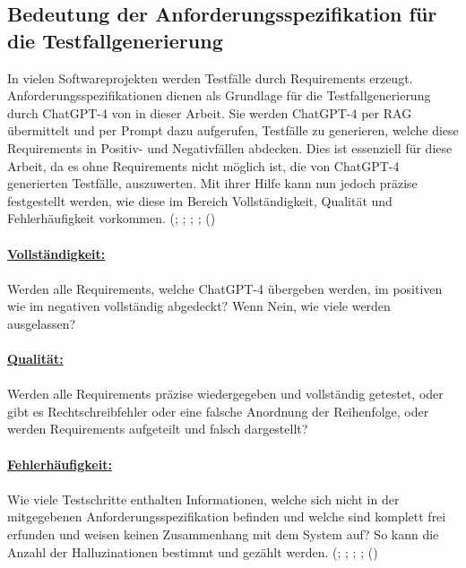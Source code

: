 \documentclass[12pt,toc=bib,toc=listof]{scrreprt}
\begin{document}
\subsection{Bedeutung der Anforderungsspezifikation für die Testfallgenerierung} %
\label{sec:bedeutungDerAnforderungsspezifikationFürDieTestfallgenerierung}
In vielen Softwareprojekten werden Testfälle durch Requirements erzeugt. Anforderungsspezifikationen dienen als Grundlage für die Testfallgenerierung durch ChatGPT-4 von \textcite{OpenAI2025} in dieser Arbeit. Sie werden ChatGPT-4 per RAG übermittelt und per Prompt dazu aufgerufen, Testfälle zu generieren, welche diese Requirements in Positiv- und Negativfällen abdecken. Dies ist essenziell für diese Arbeit, da es ohne Requirements nicht möglich ist, die von ChatGPT-4 generierten Testfälle, auszuwerten. Mit ihrer Hilfe kann nun jedoch präzise festgestellt werden, wie diese im Bereich Vollständigkeit, Qualität und Fehlerhäufigkeit vorkommen. (\cite{Aysolmaz2018}; \cite{Barmi2011}; \cite{JamaSoftware2024}; \cite{Mustafa2021}; (\cite{Visure2024})\\
\\
\textbf{\underline{Vollständigkeit:}}\\
\\
Werden alle Requirements, welche ChatGPT-4 übergeben werden, im positiven wie im negativen vollständig abgedeckt? Wenn Nein, wie viele werden ausgelassen?\\
\\
\textbf{\underline{Qualität:}}\\
\\
Werden alle Requirements präzise wiedergegeben und vollständig getestet, oder gibt es Rechtschreibfehler oder eine falsche Anordnung der Reihenfolge, oder werden Requirements aufgeteilt und falsch dargestellt?\\
\\
\textbf{\underline{Fehlerhäufigkeit:}}\\
\\
Wie viele Testschritte enthalten Informationen, welche sich nicht in der mitgegebenen Anforderungsspezifikation befinden und welche sind komplett frei erfunden und weisen keinen Zusammenhang mit dem System auf? So kann die Anzahl der Halluzinationen bestimmt und gezählt werden. (\cite{Aysolmaz2018}; \cite{Barmi2011}; \cite{JamaSoftware2024}; \cite{Mustafa2021}; (\cite{Visure2024})
\end{document}
